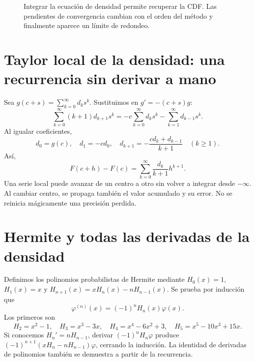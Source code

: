 \documentclass[11pt,a4paper]{article}
\theoremstyle{definition}
\begin{document}
\begin{figure}[htbp]\centering
{}
\caption{Integrar la ecuación de densidad permite recuperar la CDF. Las pendientes de convergencia cambian con el orden del método y finalmente aparece un límite de redondeo.}\label{fig:phi200-5}
\end{figure}
\section{Taylor local de la densidad: una recurrencia sin derivar a mano}
Sea $g(c+s)=\sum_{k=0}^\infty d_ks^k$.
Sustituimos en $g'=-(c+s)g$:
\[
\sum_{k=0}^\infty(k+1)d_{k+1}s^k
=-c\sum_{k=0}^\infty d_ks^k-\sum_{k=1}^\infty d_{k-1}s^k.
\]
Al igualar coeficientes,
\[
d_0=g(c),\quad d_1=-cd_0,\quad
d_{k+1}=-\frac{cd_k+d_{k-1}}{k+1}\quad(k\ge1).
\]
Así,
\[
F(c+h)-F(c)=\sum_{k=0}^\infty\frac{d_k}{k+1}h^{k+1}.
\]
Una serie local puede avanzar de un centro a otro sin volver a integrar desde $-\infty$.
Al cambiar centro, se propaga también el valor acumulado y su error. No se reinicia mágicamente una precisión perdida.

\section{Hermite y todas las derivadas de la densidad}
Definimos los polinomios probabilistas de Hermite mediante
$H_0(x)=1$, $H_1(x)=x$ y
$H_{n+1}(x)=xH_n(x)-nH_{n-1}(x)$.
Se prueba por inducción que
\[
\varphi^{(n)}(x)=(-1)^nH_n(x)\varphi(x).
\]
Los primeros son
\[
H_2=x^2-1,\quad H_3=x^3-3x,\quad
H_4=x^4-6x^2+3,\quad H_5=x^5-10x^3+15x.
\]
Si conocemos $H_n'=nH_{n-1}$, derivar $(-1)^nH_n\varphi$ produce
$(-1)^{n+1}(xH_n-nH_{n-1})\varphi$, cerrando la inducción.
La identidad de derivadas de polinomios también se demuestra a partir de la recurrencia.
\end{document}
